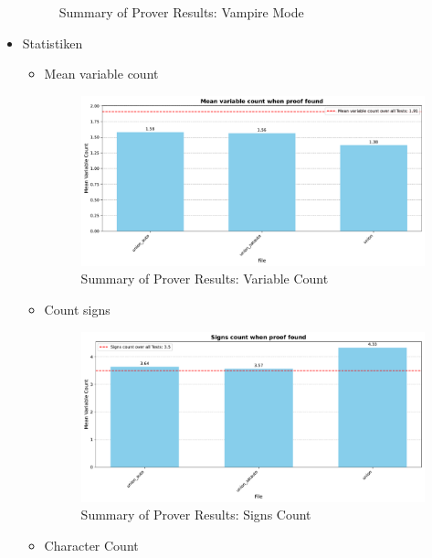 \documentclass[german,version-2020-11]{uzl-thesis}
\begin{document}
\begin{itemize}
\begin{figure}[h!]
      \caption{Summary of Prover Results: Vampire Mode}
      \label{fig:prover_results_vampire}
    \end{figure}
    \clearpage
    \item Statistiken
      \begin{itemize}
        \item Mean variable count
        \begin{figure}[h!]
          \centering
          \includegraphics[width=\textwidth]{variable_count.pdf} %
          \caption{Summary of Prover Results: Variable Count}
          \label{fig:prover_results_vampire}
        \end{figure}
        \clearpage
        \item Count signs
        \begin{figure}[h!]
          \centering
          \includegraphics[width=\textwidth]{signs_count.pdf} %
          \caption{Summary of Prover Results: Signs Count}
          \label{fig:prover_results_vampire}
        \end{figure}
        \clearpage
        \item Character Count
        \begin{figure}[h!]
          \centering

\end{figure}
\end{itemize}
\end{itemize}
\end{document}

